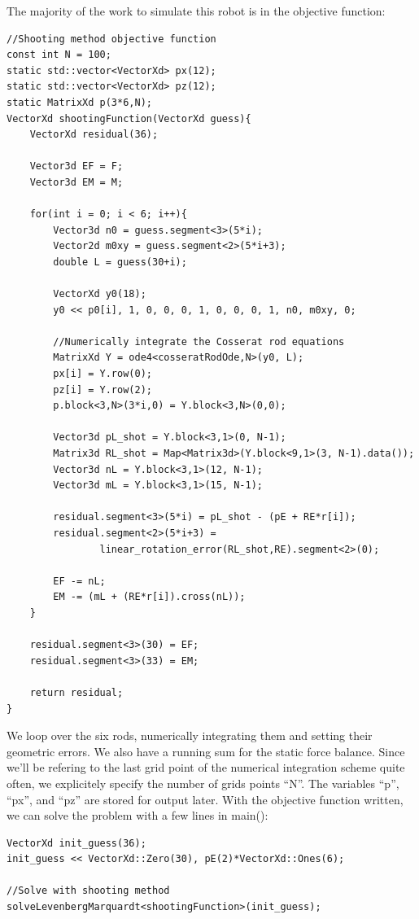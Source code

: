 \documentclass[12pt]{article}
\begin{document}
\newpage
The majority of the work to simulate this robot is in the objective function:
\begin{lstlisting}
//Shooting method objective function
const int N = 100;
static std::vector<VectorXd> px(12);
static std::vector<VectorXd> pz(12);
static MatrixXd p(3*6,N);
VectorXd shootingFunction(VectorXd guess){
    VectorXd residual(36);

    Vector3d EF = F;
    Vector3d EM = M;

    for(int i = 0; i < 6; i++){
        Vector3d n0 = guess.segment<3>(5*i);
        Vector2d m0xy = guess.segment<2>(5*i+3);
        double L = guess(30+i);

        VectorXd y0(18);
        y0 << p0[i], 1, 0, 0, 0, 1, 0, 0, 0, 1, n0, m0xy, 0;

        //Numerically integrate the Cosserat rod equations
        MatrixXd Y = ode4<cosseratRodOde,N>(y0, L);
        px[i] = Y.row(0);
        pz[i] = Y.row(2);
        p.block<3,N>(3*i,0) = Y.block<3,N>(0,0);

        Vector3d pL_shot = Y.block<3,1>(0, N-1);
        Matrix3d RL_shot = Map<Matrix3d>(Y.block<9,1>(3, N-1).data());
        Vector3d nL = Y.block<3,1>(12, N-1);
        Vector3d mL = Y.block<3,1>(15, N-1);

        residual.segment<3>(5*i) = pL_shot - (pE + RE*r[i]);
        residual.segment<2>(5*i+3) =
                linear_rotation_error(RL_shot,RE).segment<2>(0);

        EF -= nL;
        EM -= (mL + (RE*r[i]).cross(nL));
    }

    residual.segment<3>(30) = EF;
    residual.segment<3>(33) = EM;

    return residual;
}
\end{lstlisting}
We loop over the six rods, numerically integrating them and setting their geometric errors. We also have a running sum for the static force balance. Since we'll be refering to the last grid point of the numerical integration scheme quite often, we explicitely specify the number of grids points ``N''. The variables ``p'', ``px'', and ``pz'' are stored for output later. With the objective function written, we can solve the problem with a few lines in main():
\begin{lstlisting}
VectorXd init_guess(36);
init_guess << VectorXd::Zero(30), pE(2)*VectorXd::Ones(6);

//Solve with shooting method
solveLevenbergMarquardt<shootingFunction>(init_guess);
\end{lstlisting}
\end{document}
